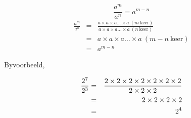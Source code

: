 

{
$$ \frac{ {a}^{m} }{ {a}^{n} }={a}^{m-n}$$
\begin{eqnarray*}
\frac{a^m}{a^n} &=& \frac{a \times a \times a \ldots \times a ~ (m~\mbox{keer})} {a \times a \times a \ldots \times a ~ (n~\mbox{keer})} \\
&= & a \times a \times a \ldots \times a ~ (m-n~\mbox{keer}) \\
&= & a^{m-n}
\end{eqnarray*}

}




          
\label{m38359*id65293}Byvoorbeeld,

\begin{eqnarray*}
    \dfrac{{2}^{7}}{{2}^{3}}& =& \dfrac{2\ensuremath{\times}2\ensuremath{\times}2\ensuremath{\times}2\ensuremath{\times}2\ensuremath{\times}2\ensuremath{\times}2}{2\ensuremath{\times}2\ensuremath{\times}2}\hfill \\
						     & =& 2\ensuremath{\times}2\ensuremath{\times}2\ensuremath{\times}2\hfill \\
						     & =& {2}^{4}\hfill \hfill 
\end{eqnarray*}




